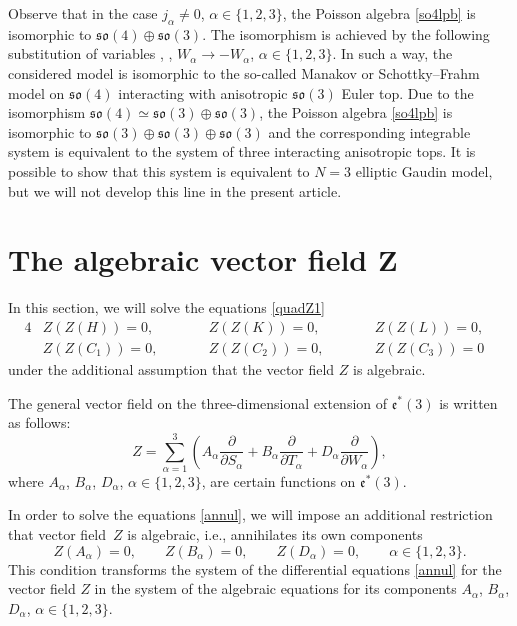 \documentclass[10pt,a4paper]{amsart}
\def\a{\alpha}
\def\b{\beta}
\def\g{\gamma}
\numberwithin{equation}{section}
\begin{document}
\begin{Remark}
 Observe that in the case $j_{\a}\neq 0$, $\a\in \{1,2, 3\}$, the Poisson algebra \eqref{so4lpb} is isomorphic to $\mathfrak{so}(4)\oplus \mathfrak{so}(3)$. The isomorphism is achieved by the following substitution of variables
\smash{$S_{\a}\rightarrow \sqrt{j_{\b}} \sqrt{j_{\g}} S_{\a}$}, \smash{$ T_{\a}\rightarrow \sqrt{j_{\a}} T_{\a}$}, $ W_{\a}\rightarrow - W_{\a}$, $ \a\in \{1,2,3\}$.
In such a way, the considered model is isomorphic to the so-called Manakov or Schottky--Frahm model on $\mathfrak{so}(4)$ interacting with anisotropic $\mathfrak{so}(3)$ Euler top.
Due to the isomorphism $\mathfrak{so}(4)\simeq \mathfrak{so}(3)\oplus \mathfrak{so}(3)$, the Poisson algebra \eqref{so4lpb} is isomorphic to $\mathfrak{so}(3)\oplus \mathfrak{so}(3)\oplus \mathfrak{so}(3)$ and the corresponding integrable system is equivalent to the system of three interacting anisotropic tops. It is possible to show that this system is equivalent to $N=3$ elliptic Gaudin model, but we will not develop this line in the present article.
\end{Remark}



\section[The algebraic vector field Z]{The algebraic vector field $\boldsymbol{Z}$}\label{sec4}
In this section, we will solve the equations
\eqref{quadZ1}
\begin{alignat}{4}
&Z(Z(H))=0,\qquad &&Z(Z(K))=0, \qquad&& Z(Z(L))=0,&\nonumber\\ &Z(Z(C_1))=0, \qquad&& Z(Z(C_2))=0, \qquad&& Z(Z(C_3))=0&\label{annul}
\end{alignat}
under the additional assumption that the vector field $Z$ is algebraic.


The general vector field on the three-dimensional extension of $\mathfrak{e}^*(3)$ is written as follows:
\[
Z=\sum\limits_{\a=1}^3\left( A_{\a}\frac{\partial}{ \partial S_{\a}}+
B_{\a}\frac{\partial}{ \partial T_{\a}}+ D_{\a}\frac{\partial}{ \partial W_{\a}}\right),
\]
where $A_{\a}$, $B_{\a}$, $D_{\a}$, $\a\in \{1,2,3\}$, are certain
functions on $\mathfrak{e}^*(3)$.

In order to solve the equations \eqref{annul}, we will impose
 an additional restriction that vector field~$Z$ is algebraic, i.e., annihilates its own components
\begin{equation}\label{ZAB}
Z(A_{\a})=0, \qquad Z(B_{\a})=0, \qquad Z(D_{\a})=0, \qquad \a\in \{1,2,3\}.
\end{equation}
This condition transforms the system of the differential equations \eqref{annul}
for the vector field $Z$ in the system of the
algebraic equations for its components $A_{\a}$, $B_{\a}$, $D_{\a}$, $\a\in \{1,2,3\}$.
\end{document}
